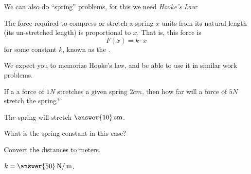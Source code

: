 \documentclass{ximera}
\begin{document}
We can also do ``spring'' problems, for this we need \textit{Hooke's
  Law}:

\begin{definition}
  The force required to compress or stretch a spring $x$ units from
  its natural length (its un-stretched length) is proportional to $x$.
  That is, this force is
  \[
  F(x) = k\cdot x
  \]
  for some constant $k$, known as the .
\end{definition}

\begin{warning}
  We expect you to memorize Hooke's law, and be able to use it in similar work problems.
\end{warning}

\begin{question}
  If a a force of $1\unit{N}$ stretches a given spring $2\unit{cm}$,
  then how far will a force of $5\unit{N}$ stretch the spring?
  \begin{prompt}
    The spring will stretch $\answer{10}\unit{cm}$.
  \end{prompt}
  \begin{question}
    What is the spring constant in this case?
    \begin{hint}
      Convert the distances to meters.
    \end{hint}
    \begin{prompt}
      $k= \answer{50}\unit{N}/\unit{m}$.
    \end{prompt}
  \end{question}
\end{question}
  
\end{document}
